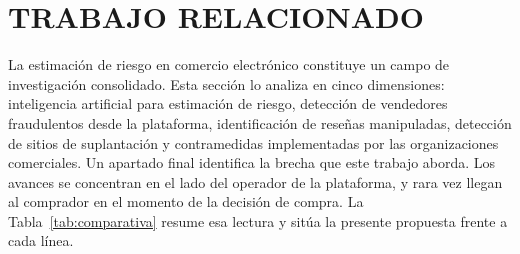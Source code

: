 
\section{TRABAJO RELACIONADO}

La estimación de riesgo en comercio electrónico constituye un campo de investigación
consolidado. Esta sección lo analiza en cinco dimensiones: inteligencia artificial para
estimación de riesgo, detección de vendedores fraudulentos desde la plataforma,
identificación de reseñas manipuladas, detección de sitios de suplantación y contramedidas
implementadas por las organizaciones comerciales. Un apartado final identifica la brecha que
este trabajo aborda. Los avances se concentran en el lado del operador de la plataforma, y
rara vez llegan al comprador en el momento de la decisión de compra. La
Tabla~\ref{tab:comparativa} resume esa lectura y sitúa la presente propuesta frente a cada
línea.

